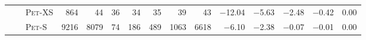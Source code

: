 \begin{tabular}{lllr rrrrrr rrrrr}
                  &                    &   \textsc{Pet}-XS  &         \num{864}  &          \num{44}  &          \num{36}  &          \num{34}  &          \num{35}  &          \num{39}  &          \num{43}  &      \num{-12.04}  &       \num{-5.63}  &       \num{-2.48}  &       \num{-0.42}  &        \num{0.00} \\ 
                  &                    &    \textsc{Pet}-S  &        \num{9216}  &        \num{8079}  &          \num{74}  &         \num{186}  &         \num{489}  &        \num{1063}  &        \num{6618}  &       \num{-6.10}  &       \num{-2.38}  &       \num{-0.07}  &       \num{-0.01}  &        \num{0.00} \\ 
\bottomrule
\end{tabular}
